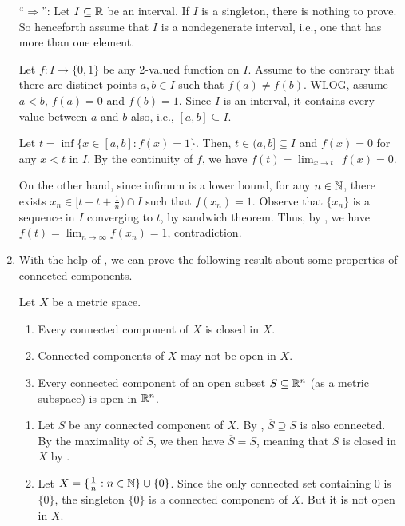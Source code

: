 \begin{enumerate}
\begin{pf}
``\(\Rightarrow\)'': Let \(I\subseteq \mathbb{R}\) be an interval. If \(I\) is a
singleton, there is nothing to prove. So henceforth assume that \(I\) is a
nondegenerate interval, i.e., one that has more than one element.

Let \(f:I\to\{0,1\}\) be any 2-valued function on \(I\). Assume to the contrary
that there are distinct points \(a,b\in I\) such that \(f(a)\ne f(b)\).  WLOG,
assume \(a<b\), \(f(a)=0\) and \(f(b)=1\). Since \(I\) is an interval, it
contains every value between \(a\) and \(b\) also, i.e., \([a,b]\subseteq I\).

Let \(t=\inf\{x\in [a,b]:f(x)=1\}\). Then, \(t\in (a,b]\subseteq I\) and
\(f(x)=0\) for any \(x<t\) in \(I\). By the continuity of \(f\), we have
\(f(t)=\lim_{x\to t^{-}}f(x)=0\).

On the other hand, since infimum is a lower bound, for any \(n\in\mathbb{N}\), there
exists \(x_n\in [t+t+\frac{1}{n})\cap I\) such that \(f(x_n)=1\). Observe that
\(\{x_n\}\) is a sequence in \(I\) converging to \(t\), by sandwich theorem.
Thus, by , we have \(f(t)=\lim_{n\to
\infty}f(x_n)=1\), contradiction.
\end{pf}

\item With the help of , we can
prove the following result about some properties of connected components.
\begin{proposition}
\label{prp:conn-compo-prop}
Let \(X\) be a metric space.
\begin{enumerate}
\item Every connected component of \(X\) is closed in \(X\).
\item Connected components of \(X\) may not be open in \(X\).
\item Every connected component of an open subset \(S\subseteq \mathbb{R}^n\) (as a
metric subspace) is open in \(\mathbb{R}^n\).
\end{enumerate}
\end{proposition}
\begin{pf}
\begin{enumerate}
\item Let \(S\) be any connected component of \(X\). By
, \(\overline{S}\supseteq S\) is also connected.
By the maximality of \(S\), we then have \(\overline{S}=S\), meaning that \(S\)
is closed in \(X\) by .

\item Let \(X=\{\frac{1}{n}:n\in\mathbb{N}\}\cup\{0\}\). Since the only connected set
containing \(0\) is \(\{0\}\), the singleton \(\{0\}\) is a connected component
of \(X\). But it is not open in \(X\).


\end{enumerate}
\end{pf}
\end{enumerate}
